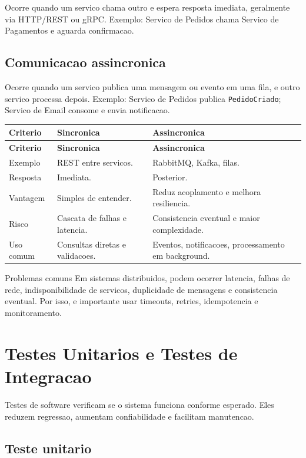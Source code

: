 \documentclass[12pt,a4paper]{article}
\begin{document}
Ocorre quando um servico chama outro e espera resposta imediata, geralmente via HTTP/REST ou gRPC. Exemplo: Servico de Pedidos chama Servico de Pagamentos e aguarda confirmacao.

\subsection{Comunicacao assincronica}

Ocorre quando um servico publica uma mensagem ou evento em uma fila, e outro servico processa depois. Exemplo: Servico de Pedidos publica \texttt{PedidoCriado}; Servico de Email consome e envia notificacao.

\begin{longtable}{@{}L{3.5cm}L{5.6cm}L{5.6cm}@{}}
\toprule
\textbf{Criterio} & \textbf{Sincronica} & \textbf{Assincronica} \\
\midrule
\endfirsthead
\toprule
\textbf{Criterio} & \textbf{Sincronica} & \textbf{Assincronica} \\
\midrule
\endhead
Exemplo & REST entre servicos. & RabbitMQ, Kafka, filas. \\
Resposta & Imediata. & Posterior. \\
Vantagem & Simples de entender. & Reduz acoplamento e melhora resiliencia. \\
Risco & Cascata de falhas e latencia. & Consistencia eventual e maior complexidade. \\
Uso comum & Consultas diretas e validacoes. & Eventos, notificacoes, processamento em background. \\
\bottomrule
\end{longtable}

\begin{observacao}{Problemas comuns}
Em sistemas distribuidos, podem ocorrer latencia, falhas de rede, indisponibilidade de servicos, duplicidade de mensagens e consistencia eventual. Por isso, e importante usar timeouts, retries, idempotencia e monitoramento.
\end{observacao}

\section{Testes Unitarios e Testes de Integracao}

Testes de software verificam se o sistema funciona conforme esperado. Eles reduzem regressao, aumentam confiabilidade e facilitam manutencao.

\subsection{Teste unitario}
\end{document}
